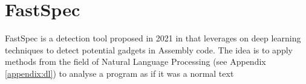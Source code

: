 \documentclass[12pt,a4paper]{book}
\theoremstyle{definition}
\begin{document}
	\section{FastSpec}\label{sec:fastspec}
	FastSpec is a detection tool proposed in 2021 in \cite{Tol2021} that leverages on deep learning techniques to detect potential gadgets in Assembly code. The idea is to apply methods from the field of Natural Language Processing (see Appendix \ref{appendix:dl}) to analyse a program as if it was a normal text 
	\begin{comment}
	SpectreGAN is a Generative Adversarial Network that was presented along with FastSpec \cite{Tol2021}, a tool based on deep learning that is able to identify Spectre gadgets much faster than common rule-based methods. The need to employ deep learning techniques comes from a significant limitation encountered in other analysis tools: the detection of vulnerable code sections often relies on a pattern matching process that compares these sections with known gadgets, which amount to only 17 (15 by Kocher \cite{Kocher2018} and 2 modified example introduced by Spectector). Despite being conceptually sound, this strategy falls short at recognising subtle code variations occuring in different programs. Furthermore, such a low number of gadgets makes it difficult to perform a comprehensive analysis of the tools.
	
	The authors of FastSpec target this problem through the following steps:
	\begin{itemize}
		\item They extend the current set of 15 gadgets to 1 million by applying a technique called \textit{mutational fuzzing}, creating an appropriate dataset for the deep learning algorithm;
		\item They describe a specific implementation of a GAN, named \textit{SpectreGAN}, that is trained on the dataset mentioned in the preovious point to learn the distribution of existing Spectre gadgets;
		\item They introduce \textit{FastSpec}, a tool based on supervised neural network embeddings, to identify potential gadgets faster that rule-based methods.
	\end{itemize}
	The rest of the section is focused on the first two points, namely in the parts that deal with the generation of new gadgets, as FastSpec is out of our scope of interest. All the background notions about the deep learning techniques used within this tool are discussed in Appendix \ref{appendix:dl}.


\end{comment}
\end{document}
